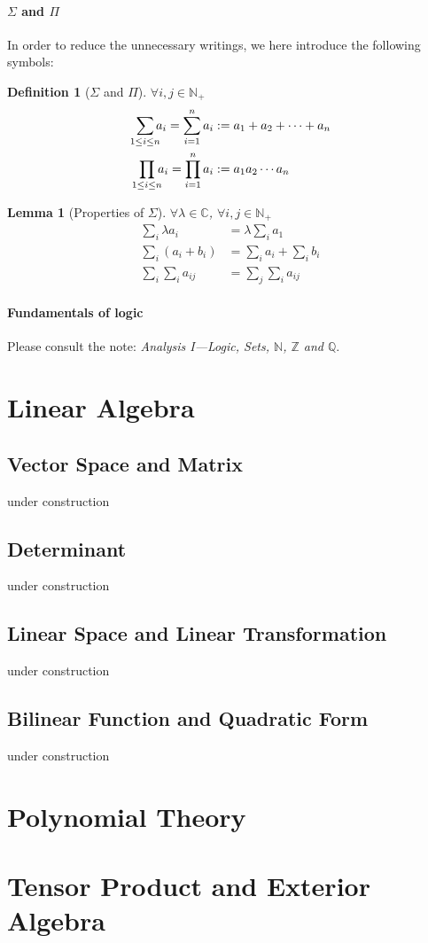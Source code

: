 \documentclass[a4paper,oneside]{book}
\newtheorem{definition}{Definition}[section]
\newtheorem{lemma}{Lemma}[section]
\begin{document}
				\subsection{$\Sigma$ and $\Pi$}
					In order to reduce the unnecessary writings, we here introduce the following symbols:
					\begin{definition}[$\Sigma$ and $\Pi$]
						$\forall i,j\in\mathbb{N}_+$
						\begin{align*}
							\sum_{1\leq i\leq n}\mspace{-9mu}a_i=\sum_{i=1}^{n}a_i&:=a_1+a_2+\dotsb +a_n\\
							\prod_{1\leq i\leq n}\mspace{-9mu}a_i=\prod_{i=1}^{n}a_i&:=a_1a_2\dotsm a_n
						\end{align*}
					\end{definition}
				\begin{lemma}[Properties of $\Sigma$]
					$\forall \lambda\in\mathbb{C}$, $\forall i,j\in\mathbb{N}_+$
					\begin{align*}
						\sum_{i}\lambda a_i&=\lambda\sum_{i}a_1\\
						\sum_{i}(a_i+b_i)&=\sum_{i}a_i+\sum_{i}b_i\\
						\sum_{i}\sum_{i}a_{ij}&=\sum_{j}\sum_{i}a_{ij}
					\end{align*}
				\end{lemma}
				\subsection{Fundamentals of logic}
					Please consult the note: \textit{Analysis I---Logic, Sets, $\mathbb{N}$, $\mathbb{Z}$ and $\mathbb{Q}$}.
\part{Linear Algebra}
	\chapter{Vector Space and Matrix}
	under construction
	\chapter{Determinant}
	under construction
	\chapter{Linear Space and Linear Transformation}
	under construction
	\chapter{Bilinear Function and Quadratic Form}
	under construction
\part{Polynomial Theory}

\part{Tensor Product and Exterior Algebra}
\end{document}
